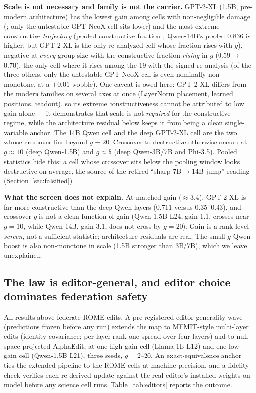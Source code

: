 \documentclass[preprint,12pt]{elsarticle}
\begin{document}
\textbf{Scale is not necessary and family is not the carrier.} GPT-2-XL (1.5B,
pre-modern architecture) has the lowest gain among cells with non-negligible damage
(\gainGptxlDeep{}; only the untestable GPT-NeoX cell sits lower) and the most
extreme constructive \emph{trajectory} (pooled constructive fraction
\fracGptxlDeep{}; Qwen-14B's pooled 0.836 is higher, but GPT-2-XL is the only
re-analyzed cell whose fraction rises with $g$), negative at
\emph{every} group size with the constructive fraction \emph{rising} in $g$ (0.59$\to$0.70),
the only cell where it rises among the 19 with the signed re-analysis (of the three
others, only the untestable GPT-NeoX cell is even nominally non-monotone, at a
$\pm0.01$ wobble). One caveat is owed here: GPT-2-XL differs from the
modern families on several axes at once (LayerNorm placement, learned positions,
readout), so its extreme constructiveness cannot be attributed to low gain alone ---
it demonstrates that scale is not \emph{required} for the constructive regime, while
the architecture residual below keeps it from being a clean single-variable anchor.
The 14B Qwen cell and the deep GPT-2-XL cell are the two whose
crossover lies beyond $g{=}20$. Crossover to destructive otherwise occurs at $g\approx10$
(deep Qwen-1.5B) and $g\approx5$ (deep Qwen-3B/7B and Phi-3.5). Pooled statistics hide this:
a cell whose crossover sits below the pooling window looks destructive on average, the
source of the retired ``sharp 7B$\to$14B jump'' reading (Section~\ref{sec:falsified}).

\textbf{What the screen does not explain.} At matched gain ($\approx3.4$), GPT-2-XL is far
more constructive than the deep Qwen layers (0.711 versus 0.35--0.43), and crossover-$g$ is
not a clean function of gain (Qwen-1.5B L24, gain 1.1, crosses near $g{=}10$, while Qwen-14B,
gain 3.1, does not cross by $g{=}20$). Gain is a rank-level \emph{screen}, not a sufficient
statistic; architecture residuals are real. The small-$g$ Qwen boost is also non-monotone in
scale (1.5B stronger than 3B/7B), which we leave unexplained.

\subsection{The law is editor-general, and editor choice dominates federation safety}
\label{sec:editors}
All results above federate ROME edits. A pre-registered editor-generality wave (predictions
frozen before any run) extends the map to MEMIT-style multi-layer edits (identity
covariance; per-layer rank-one spread over four layers) and to null-space-projected
AlphaEdit, at one high-gain cell (Llama-1B L12) and one low-gain cell (Qwen-1.5B L21), three
seeds, $g{=}2$--20. An exact-equivalence anchor ties the extended pipeline to the ROME cells
at machine precision, and a fidelity check verifies each re-derived update against the real
editor's installed weights on-model before any science cell runs. Table~\ref{tab:editors}
reports the outcome.
\end{document}

